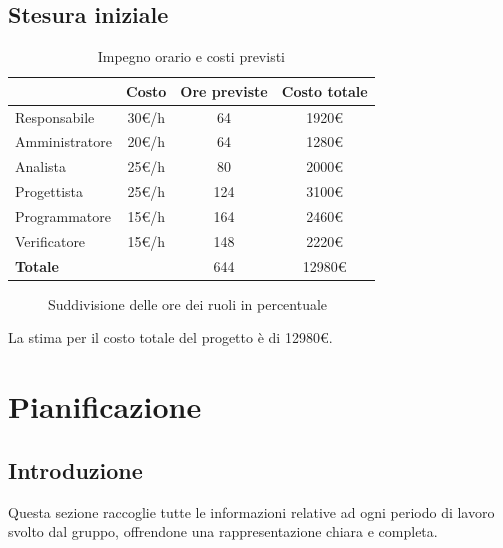 \documentclass[a4paper,12pt]{article}
\begin{document}
    \subsection{Stesura iniziale}
        \begin{table}[H]
        \centering
        \caption{Impegno orario e costi previsti}
        \label{tab:costi1}
        \begin{tabular}{|l|c|c|c|}
        \hline
            \rowcolor{lightgray}{\textbf{Ruolo}} & {\textbf{Costo}} & {\textbf{Ore previste}} & {\textbf{Costo totale}} \\
        \hline
            Responsabile & 30\euro{}/h & 64 & 1920\euro{} \\
        \hline
            Amministratore & 20\euro{}/h & 64 & 1280\euro{} \\
        \hline
            Analista & 25\euro{}/h & 80 & 2000\euro{} \\
        \hline
            Progettista & 25\euro{}/h & 124 & 3100\euro{} \\
        \hline
            Programmatore & 15\euro{}/h & 164 & 2460\euro{} \\
        \hline
            Verificatore & 15\euro{}/h & 148 & 2220\euro{} \\
        \hline
            \textbf{Totale} & & 644 & 12980\euro{} \\
        \hline
        \end{tabular}
        \end{table}

        \begin{figure}[H]
            \centering
            \caption{Suddivisione delle ore dei ruoli in percentuale}
            \label{fig:costi1}
        \end{figure}

    La stima per il costo totale del progetto è di 12980\euro{}.

\newpage
\section{Pianificazione}
\label{sec:pianificazione}
    \subsection{Introduzione}
    Questa sezione raccoglie tutte le informazioni relative ad ogni periodo di lavoro svolto dal gruppo, offrendone una rappresentazione chiara e completa.
\end{document}
